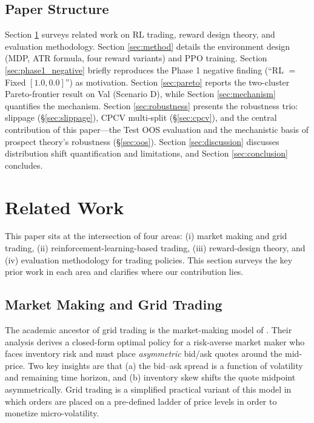 \documentclass[11pt, a4paper]{article}
\begin{document}
\subsection{Paper Structure}
\label{sec:intro_structure}

Section \ref{sec:related} surveys related work on RL trading, reward design
theory, and evaluation methodology. Section \ref{sec:method} details the
environment design (MDP, ATR formula, four reward variants) and PPO training.
Section \ref{sec:phase1_negative} briefly reproduces the Phase 1 negative
finding (``RL $=$ Fixed $[1.0, 0.0]$'') as motivation. Section \ref{sec:pareto}
reports the two-cluster Pareto-frontier result on Val (Scenario D), while
Section \ref{sec:mechanism} quantifies the mechanism. Section
\ref{sec:robustness} presents the robustness trio: slippage
(\S\ref{sec:slippage}), CPCV multi-split (\S\ref{sec:cpcv}), and the central
contribution of this paper---the Test OOS evaluation and the mechanistic basis
of prospect theory's robustness (\S\ref{sec:oos}). Section \ref{sec:discussion}
discusses distribution shift quantification and limitations, and Section
\ref{sec:conclusion} concludes.

\section{Related Work}
\label{sec:related}

This paper sits at the intersection of four areas: (i) market making and grid
trading, (ii) reinforcement-learning-based trading, (iii) reward-design theory,
and (iv) evaluation methodology for trading policies. This section surveys the
key prior work in each area and clarifies where our contribution lies.

\subsection{Market Making and Grid Trading}
\label{sec:related_grid}

The academic ancestor of grid trading is the market-making model of
\citet{avellaneda2008market}. Their analysis derives a closed-form optimal
policy for a risk-averse market maker who faces inventory risk and must place
\emph{asymmetric} bid/ask quotes around the mid-price. Two key insights are
that (a) the bid--ask spread is a function of volatility and remaining time
horizon, and (b) inventory skew shifts the quote midpoint asymmetrically. Grid
trading is a simplified practical variant of this model in which orders are
placed on a pre-defined ladder of price levels in order to monetize
micro-volatility.
\end{document}
